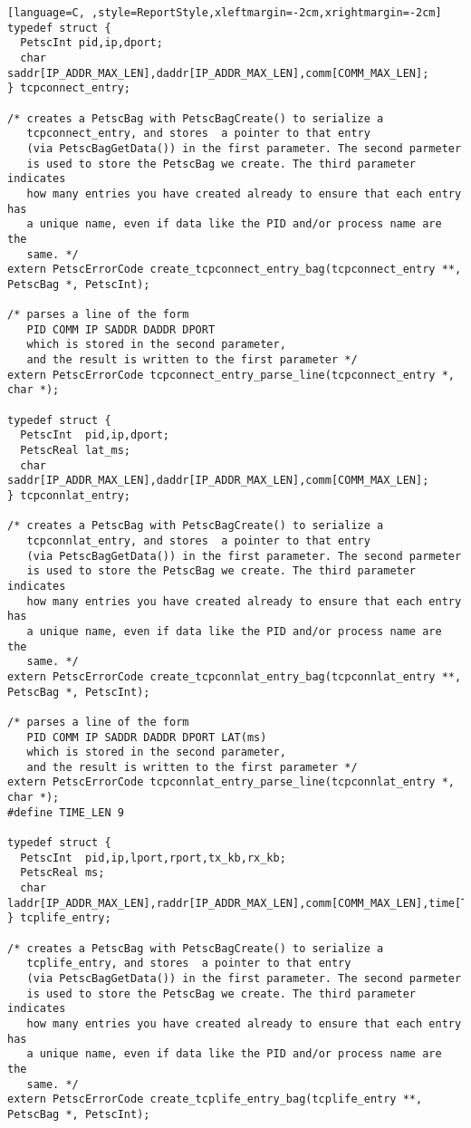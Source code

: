 \documentclass[11pt]{article}
\begin{document}
\begin{lstlisting}[language=C, ,style=ReportStyle,xleftmargin=-2cm,xrightmargin=-2cm]
typedef struct {
  PetscInt pid,ip,dport;
  char     saddr[IP_ADDR_MAX_LEN],daddr[IP_ADDR_MAX_LEN],comm[COMM_MAX_LEN];
} tcpconnect_entry;

/* creates a PetscBag with PetscBagCreate() to serialize a
   tcpconnect_entry, and stores  a pointer to that entry
   (via PetscBagGetData()) in the first parameter. The second parmeter
   is used to store the PetscBag we create. The third parameter indicates
   how many entries you have created already to ensure that each entry has
   a unique name, even if data like the PID and/or process name are the 
   same. */
extern PetscErrorCode create_tcpconnect_entry_bag(tcpconnect_entry **, PetscBag *, PetscInt);

/* parses a line of the form 
   PID COMM IP SADDR DADDR DPORT
   which is stored in the second parameter, 
   and the result is written to the first parameter */
extern PetscErrorCode tcpconnect_entry_parse_line(tcpconnect_entry *, char *);

typedef struct {
  PetscInt  pid,ip,dport;
  PetscReal lat_ms;
  char      saddr[IP_ADDR_MAX_LEN],daddr[IP_ADDR_MAX_LEN],comm[COMM_MAX_LEN];
} tcpconnlat_entry;

/* creates a PetscBag with PetscBagCreate() to serialize a
   tcpconnlat_entry, and stores  a pointer to that entry
   (via PetscBagGetData()) in the first parameter. The second parmeter
   is used to store the PetscBag we create. The third parameter indicates
   how many entries you have created already to ensure that each entry has
   a unique name, even if data like the PID and/or process name are the 
   same. */
extern PetscErrorCode create_tcpconnlat_entry_bag(tcpconnlat_entry **, PetscBag *, PetscInt);

/* parses a line of the form 
   PID COMM IP SADDR DADDR DPORT LAT(ms)
   which is stored in the second parameter, 
   and the result is written to the first parameter */
extern PetscErrorCode tcpconnlat_entry_parse_line(tcpconnlat_entry *, char *);
#define TIME_LEN 9

typedef struct {
  PetscInt  pid,ip,lport,rport,tx_kb,rx_kb;
  PetscReal ms;
  char      laddr[IP_ADDR_MAX_LEN],raddr[IP_ADDR_MAX_LEN],comm[COMM_MAX_LEN],time[TIME_LEN];
} tcplife_entry;

/* creates a PetscBag with PetscBagCreate() to serialize a
   tcplife_entry, and stores  a pointer to that entry
   (via PetscBagGetData()) in the first parameter. The second parmeter
   is used to store the PetscBag we create. The third parameter indicates
   how many entries you have created already to ensure that each entry has
   a unique name, even if data like the PID and/or process name are the 
   same. */
extern PetscErrorCode create_tcplife_entry_bag(tcplife_entry **, PetscBag *, PetscInt);


\end{lstlisting}
\end{document}
